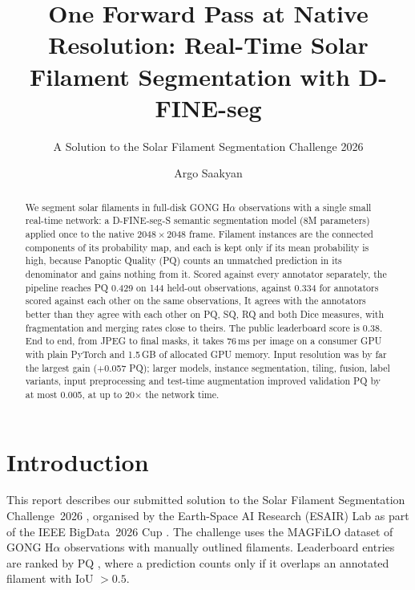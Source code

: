 \documentclass[sigconf]{acmart}
\begin{document}
\title[Real-Time Native-Resolution Filament Segmentation]{One Forward Pass at Native Resolution: Real-Time Solar Filament Segmentation with D-FINE-seg}
\subtitle{A Solution to the Solar Filament Segmentation Challenge 2026} %

\author{Argo Saakyan}

\begin{abstract}
We segment solar filaments in full-disk GONG H$\alpha$ observations with a single small real-time network: a D-FINE-seg-S semantic segmentation model (8M parameters) applied once to the native $2048{\times}2048$ frame. Filament instances are the connected components of its probability map, and each is kept only if its mean probability is high, because Panoptic Quality (PQ) counts an unmatched prediction in its denominator and gains nothing from it. Scored against every annotator separately, the pipeline reaches PQ 0.429 on 144 held-out observations, against 0.334 for annotators scored against each other on the same observations, It agrees with the annotators better than they agree with each other on PQ, SQ, RQ and both Dice measures, with fragmentation and merging rates close to theirs. The public leaderboard score is 0.38. End to end, from JPEG to final masks, it takes 76\,ms per image on a consumer GPU with plain PyTorch and 1.5\,GB of allocated GPU memory. Input resolution was by far the largest gain (+0.057 PQ); larger models, instance segmentation, tiling, fusion, label variants, input preprocessing and test-time augmentation improved validation PQ by at most 0.005, at up to 20$\times$ the network time.
\end{abstract}

\maketitle

\section{Introduction}
This report describes our submitted solution to the Solar Filament Segmentation Challenge~2026 \cite{filament-segmentation-2026}, organised by the Earth-Space AI Research (ESAIR) Lab as part of the IEEE BigData~2026 Cup \cite{ieeebigdata2026cup}. The challenge uses the MAGFiLO dataset \cite{ahmadzadeh2024dataset} of GONG \cite{harvey1996gong} H$\alpha$ observations with manually outlined filaments. Leaderboard entries are ranked by PQ \cite{kirillov2019panoptic}, where a prediction counts only if it overlaps an annotated filament with IoU $>0.5$.
\end{document}
